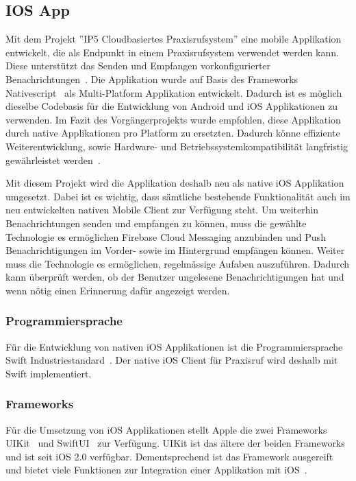 
\subsection{IOS App}

Mit dem Projekt ''IP5 Cloudbasiertes Praxisrufsystem'' eine mobile Applikation entwickelt, die als Endpunkt in einem Praxisrufsystem verwendet werden kann.
Diese unterstützt das Senden und Empfangen vorkonfigurierter Benachrichtungen~\cite{ip5}.
Die Applikation wurde auf Basis des Frameworks Nativescript~\cite{nativescript} als Multi-Platform Applikation entwickelt.
Dadurch ist es möglich dieselbe Codebasis für die Entwicklung von Android und iOS Applikationen zu verwenden.
Im Fazit des Vorgängerprojekts wurde empfohlen, diese Applikation durch native Applikationen pro Platform zu ersetzten.
Dadurch könne effiziente Weiterentwicklung, sowie Hardware- und Betriebssystemkompatibilität langfristig gewährleistet werden~\cite{ip5}.

Mit diesem Projekt wird die Applikation deshalb neu als native iOS Applikation umgesetzt.
Dabei ist es wichtig, dass sämtliche bestehende Funktionalität auch im neu entwickelten nativen Mobile Client zur Verfügung steht.
Um weiterhin Benachrichtungen senden und empfangen zu können, muss die gewählte Technologie es ermöglichen Firebase Cloud Messaging anzubinden
und Push Benachrichtigungen im Vorder- sowie im Hintergrund empfängen können.
Weiter muss die Technologie es ermöglichen, regelmässige Aufaben auszuführen.
Dadurch kann überprüft werden, ob der Benutzer ungelesene Benachrichtigungen hat und wenn nötig einen Erinnerung dafür angezeigt werden.

\subsubsection{Programmiersprache}

Für die Entwicklung von nativen iOS Applikationen ist die Programmiersprache Swift Industriestandard~\cite{ios_swift}.
Der native iOS Client für Praxisruf wird deshalb mit Swift implementiert.

\subsubsection{Frameworks}

Für die Umsetzung von iOS Applikationen stellt Apple die zwei Frameworks UIKit~\cite{ios_uikit} und SwiftUI~\cite{ios_swift_ui} zur Verfügung.
UIKit ist das ältere der beiden Frameworks und ist seit iOS 2.0 verfügbar.
Dementsprechend ist das Framework ausgereift und bietet viele Funktionen zur Integration einer Applikation mit iOS~\cite{ios_uikit}.

